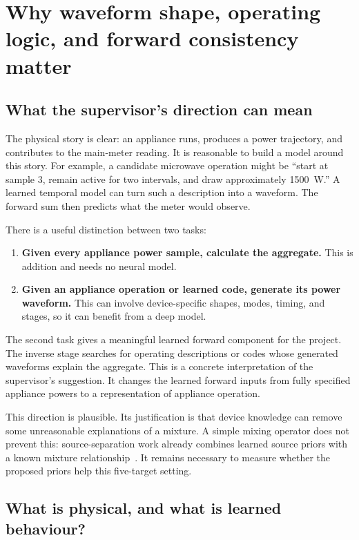 \documentclass[11pt]{article}
\begin{document}
\section{Why waveform shape, operating logic, and forward consistency matter}
\label{sec:behaviour_logic}

\subsection{What the supervisor's direction can mean}

The physical story is clear: an appliance runs, produces a power trajectory, and contributes to the main-meter reading. It is reasonable to build a model around this story. For example, a candidate microwave operation might be ``start at sample 3, remain active for two intervals, and draw approximately 1500~W.'' A learned temporal model can turn such a description into a waveform. The forward sum then predicts what the meter would observe.

There is a useful distinction between two tasks:
\begin{enumerate}
    \item \textbf{Given every appliance power sample, calculate the aggregate.} This is addition and needs no neural model.
    \item \textbf{Given an appliance operation or learned code, generate its power waveform.} This can involve device-specific shapes, modes, timing, and stages, so it can benefit from a deep model.
\end{enumerate}
The second task gives a meaningful learned forward component for the project. The inverse stage searches for operating descriptions or codes whose generated waveforms explain the aggregate. This is a concrete interpretation of the supervisor's suggestion. It changes the learned forward inputs from fully specified appliance powers to a representation of appliance operation.

This direction is plausible. Its justification is that device knowledge can remove some unreasonable explanations of a mixture. A simple mixing operator does not prevent this: source-separation work already combines learned source priors with a known mixture relationship~\cite{jayaram2020}. It remains necessary to measure whether the proposed priors help this five-target setting.

\subsection{What is physical, and what is learned behaviour?}
\end{document}
